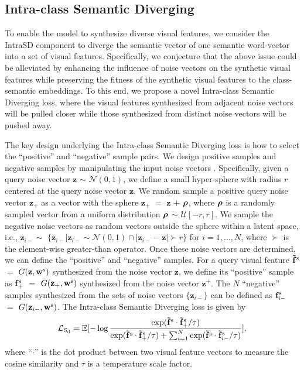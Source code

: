 \documentclass[10pt,twocolumn,letterpaper]{article}
\newcommand{\bm}[1]{\mbox{\boldmath{$#1$}}}
\begin{document}
\subsection{Intra-class Semantic Diverging}

To enable the model to synthesize diverse visual features, we consider the IntraSD component to diverge the semantic vector of one semantic word-vector into a set of visual features.
Specifically, we conjecture that the above issue could be alleviated by enhancing the influence of noise vectors on the synthetic visual features while preserving the fitness of the synthetic visual features to the class-semantic embeddings. To this end, we propose a novel Intra-class Semantic Diverging loss, where the visual features synthesized from adjacent noise vectors will be pulled closer while those synthesized from distinct noise vectors will be pushed away.

The key design underlying the Intra-class Semantic Diverging loss is how to select the ``positive'' and ``negative'' sample pairs. We design positive samples and negative samples by manipulating the input noise vectors \cite{liu2021divco}. Specifically, given a query noise vector $\textbf{z}$ $\sim$ $\mathcal N(0,1)$, we define a small hyper-sphere with radius $r$ centered at the query noise vector $\textbf{z}$. We random sample a positive query noise vector $\textbf{z}_{+}$ as a vector with the sphere $\textbf{z}_{+}$ $=$ $\textbf{z}$ $+$ $\bm{\rho}$, where $\bm{\rho}$ is a randomly sampled vector from a uniform distribution $\bm{\rho}$ $\sim$ $\mathcal U[-r,r]$. We sample the negative noise vectors as random vectors outside the sphere within a latent space, i.e., $\textbf{z}_{i-} \sim$
$\{\textbf{z}_{i-}|\textbf{z}_{i-} \sim \mathcal N(0,1) \cap |\textbf{z}_{i-} - \textbf{z}| \succ r\}$ for $i=1,\ldots,N$, where $\succ$ is the element-wise greater-than operator. Once these noise vectors are determined, we can define the ``positive'' and ``negative'' samples. For a query visual feature $\mathbf{\tilde{f}}^{\rm s}$ $=$ $G(\mathbf{z},\mathbf{w}^{\rm s})$ synthesized from the noise vector $\mathbf{z}$, we define its ``positive'' sample as $\mathbf{f}^{\rm s}_+$ $=$ $G(\mathbf{z}_+,\mathbf{w}^{\rm s})$ synthesized from the noise vector $\mathbf{z}^{+}$. The $N$ ``negative'' samples synthesized from the sets of noise vectors $\{\mathbf{z}_{i-}\}$ can be defined as $\mathbf{f}^{\rm s}_{i-}$ $=$ $G(\mathbf{z}_{i-},\mathbf{w}^{\rm s})$. The Intra-class Semantic Diverging loss is given by
\begin{equation}
\mathcal{L}_{\rm S_d} = \mathbb{E}[- \log \frac{\mathrm{exp}(\mathbf{\tilde{f}}^{\rm s} \cdot \mathbf{\tilde{f}}^{\rm s}_{\rm +}/\tau)}{\mathrm{exp}(\mathbf{\tilde{f}}^{\rm s} \cdot \mathbf{\tilde{f}}^{\rm s}_{\rm +}/\tau) + \sum_{i=1}^{N}\mathrm{exp}(\mathbf{\tilde{f}}^{\rm s} \cdot \mathbf{\tilde{f}}^{\rm s}_{i-}/\tau)}],
\label{lcr}
\end{equation}
where ``$\cdot$'' is the dot product between two visual feature vectors to measure the cosine similarity and $\tau$ is a temperature scale factor.
\end{document}

